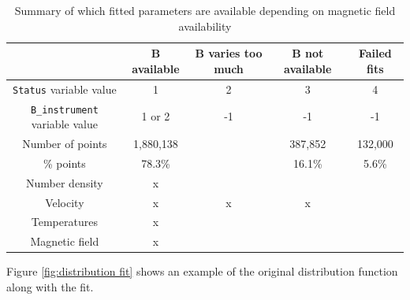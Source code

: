 \documentclass[11pt,a4paper]{article}
\begin{document}
\begin{table}
	\centering
	\begin{tabular}{ c | c | c | c | c |}
									& $\mathbf{B}$ available	& $\mathbf{B}$ varies too much	& $\mathbf{B}$ not available	& Failed fits 	\\ \hline
	\texttt{Status} variable value		& 1						& 2							& 3							& 4			\\ \hline
	\texttt{B\_instrument} variable value	& 1 or 2					& -1							& -1							& -1			\\ \hline			
	Number of points 					& 1,880,138				&							& 387,852					& 132,000	\\ \hline		
	\% points						& 78.3\%					&							& 16.1\%						& 5.6\%		\\ \hline \hline
	Number density					& x						&							&							&			\\ 
	Velocity							& x						& x							& x							&			\\ 
	Temperatures						& x						&							&							&			\\ 
	Magnetic field					& x						&							&							&			\\
	\end{tabular}
	\caption{Summary of which fitted parameters are available depending on magnetic field availability}
	\label{tab:variable availability}
\end{table}

Figure \ref{fig:distribution fit} shows an example of the original distribution function along with the fit.
\end{document}

